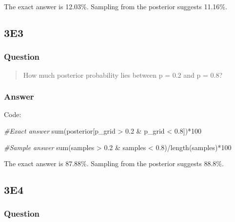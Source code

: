 \documentclass[
]{book}
\newenvironment{Shaded}{\begin{snugshade}}{\end{snugshade}}
\newcommand{\CommentTok}[1]{\textcolor[rgb]{0.56,0.35,0.01}{\textit{#1}}}
\newcommand{\DecValTok}[1]{\textcolor[rgb]{0.00,0.00,0.81}{#1}}
\newcommand{\FloatTok}[1]{\textcolor[rgb]{0.00,0.00,0.81}{#1}}
\newcommand{\FunctionTok}[1]{\textcolor[rgb]{0.00,0.00,0.00}{#1}}
\newcommand{\NormalTok}[1]{#1}
\newcommand{\SpecialCharTok}[1]{\textcolor[rgb]{0.00,0.00,0.00}{#1}}
\begin{document}
The exact answer is 12.03\%. Sampling from the posterior suggests 11.16\%.

\hypertarget{e3-1}{%
\subsection*{3E3}\label{e3-1}}

\hypertarget{question-17}{%
\subsubsection*{Question}\label{question-17}}

\begin{quote}
How much posterior probability lies between p = 0.2 and p = 0.8?
\end{quote}

\hypertarget{answer-17}{%
\subsubsection*{Answer}\label{answer-17}}

Code:

\begin{Shaded}
\begin{Highlighting}[]
\CommentTok{\#Exact answer}
\FunctionTok{sum}\NormalTok{(posterior[p\_grid }\SpecialCharTok{\textgreater{}} \FloatTok{0.2} \SpecialCharTok{\&}\NormalTok{ p\_grid }\SpecialCharTok{\textless{}} \FloatTok{0.8}\NormalTok{])}\SpecialCharTok{*}\DecValTok{100}

\CommentTok{\#Sample answer}
\FunctionTok{sum}\NormalTok{(samples }\SpecialCharTok{\textgreater{}} \FloatTok{0.2} \SpecialCharTok{\&}\NormalTok{ samples }\SpecialCharTok{\textless{}} \FloatTok{0.8}\NormalTok{)}\SpecialCharTok{/}\FunctionTok{length}\NormalTok{(samples)}\SpecialCharTok{*}\DecValTok{100}
\end{Highlighting}
\end{Shaded}

The exact answer is 87.88\%. Sampling from the posterior suggests 88.8\%.

\hypertarget{e4-1}{%
\subsection*{3E4}\label{e4-1}}

\hypertarget{question-18}{%
\subsubsection*{Question}\label{question-18}}
\end{document}
